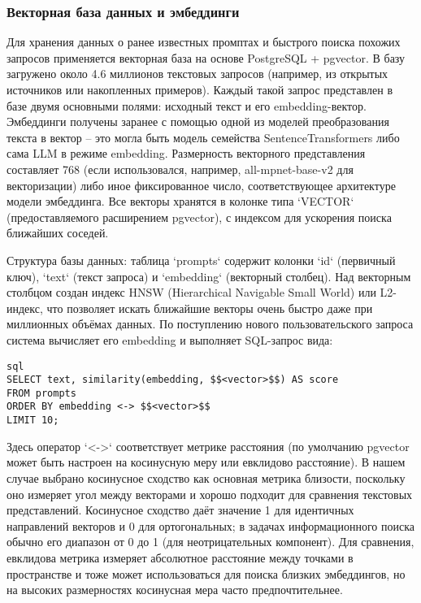 \subsubsection{Векторная база данных и эмбеддинги}

Для хранения данных о ранее известных промптах и быстрого поиска похожих запросов применяется векторная база на основе PostgreSQL + pgvector. В базу загружено около 4.6 миллионов текстовых запросов (например, из открытых источников или накопленных примеров). Каждый такой запрос представлен в базе двумя основными полями: исходный текст и его embedding-вектор. Эмбеддинги получены заранее с помощью одной из моделей преобразования текста в вектор – это могла быть модель семейства SentenceTransformers либо сама LLM в режиме embedding. Размерность векторного представления составляет 768 (если использовался, например, all-mpnet-base-v2 для векторизации) либо иное фиксированное число, соответствующее архитектуре модели эмбеддинга. Все векторы хранятся в колонке типа `VECTOR` (предоставляемого расширением pgvector), с индексом для ускорения поиска ближайших соседей.

Структура базы данных: таблица `prompts` содержит колонки `id` (первичный ключ), `text` (текст запроса) и `embedding` (векторный столбец). Над векторным столбцом создан индекс HNSW (Hierarchical Navigable Small World) или L2-индекс, что позволяет искать ближайшие векторы очень быстро даже при миллионных объёмах данных. По поступлению нового пользовательского запроса система вычисляет его embedding и выполняет SQL-запрос вида:

\begin{verbatim}
sql
SELECT text, similarity(embedding, $$<vector>$$) AS score
FROM prompts
ORDER BY embedding <-> $$<vector>$$ 
LIMIT 10;
\end{verbatim}
Здесь оператор `<->` соответствует метрике расстояния (по умолчанию pgvector может быть настроен на косинусную меру или евклидово расстояние). В нашем случае выбрано косинусное сходство как основная метрика близости, поскольку оно измеряет угол между векторами и хорошо подходит для сравнения текстовых представлений. Косинусное сходство даёт значение 1 для идентичных направлений векторов и 0 для ортогональных; в задачах информационного поиска обычно его диапазон от 0 до 1 (для неотрицательных компонент). Для сравнения, евклидова метрика измеряет абсолютное расстояние между точками в пространстве и тоже может использоваться для поиска близких эмбеддингов, но на высоких размерностях косинусная мера часто предпочтительнее.

